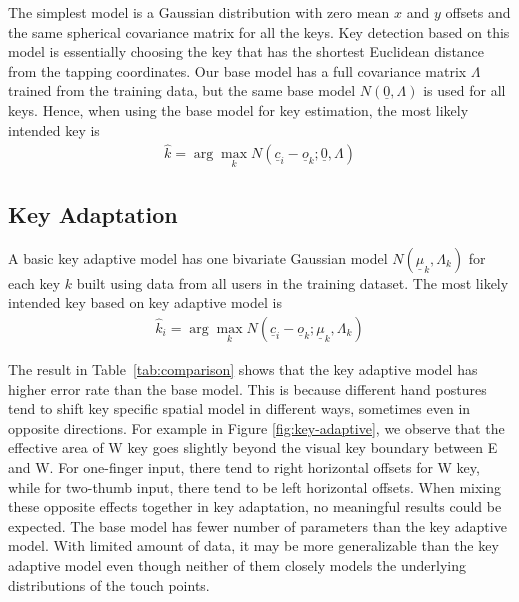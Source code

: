 \documentclass{sigchi}
\begin{document}
The simplest model is a Gaussian distribution with zero mean $x$ and $y$
 offsets and the same spherical covariance matrix for all the keys. Key
detection based on this model is essentially choosing the key that has the shortest Euclidean distance from the tapping coordinates. 
Our base model has a full covariance matrix $\Lambda$ trained from the
training data, but the same base model $N(\underline 0, \Lambda)$ is used for all keys. Hence, when using the base model for key estimation, the most likely intended key is
\begin{align}          
\hat k = \arg\max_k N(\underline c_i - \underline o_k; \underline 0, \Lambda)
\end{align}

\subsection{Key Adaptation}
A basic key adaptive model has one bivariate Gaussian model
$N(\underline\mu_k, \Lambda_k)$ for each key $k$ built  using data from all users in the training dataset. The most likely intended key based on key adaptive model is
\begin{align}          
\hat k_i = \arg\max_k N(\underline c_i - \underline o_k; \underline \mu_k, \Lambda_k)
\end{align}

The result in Table~\ref{tab:comparison} shows that the key adaptive 
model has higher error rate than the base model. This is because different hand
postures tend to shift key specific spatial model in different ways, sometimes even in opposite
directions. For example in Figure \ref{fig:key-adaptive}, we observe that the
effective area of W key goes slightly beyond the visual key boundary between E 
and W. For one-finger input, there tend to right horizontal offsets for W key, 
while for two-thumb input, there tend to be left horizontal offsets. When mixing
these opposite effects together in key adaptation, no meaningful results could
be expected. The base model has fewer number of
parameters than the key adaptive model. With limited amount of data, it
may be more generalizable than the key adaptive model even though neither
of them closely models the underlying distributions of the touch points.
\end{document}
